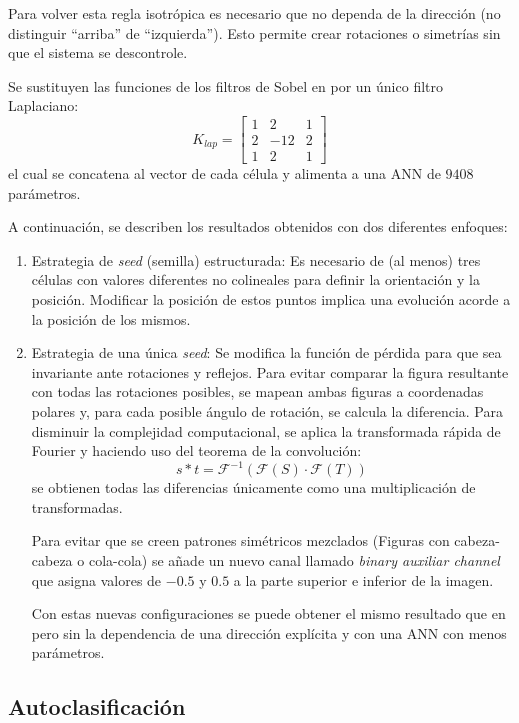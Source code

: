 Para volver esta regla isotrópica es necesario que no dependa de la dirección (no distinguir ``arriba'' de ``izquierda''). Esto permite crear rotaciones o simetrías sin que el sistema se descontrole.

Se sustituyen las funciones de los filtros de Sobel en \cite{mordvintsevNCA} por un único filtro Laplaciano:
\[
K_{lap} = \begin{bmatrix}
	1 & 2 & 1 \\
	2 & -12 & 2 \\
	1 & 2 & 1 
\end{bmatrix}
\]
el cual se concatena al vector de cada célula y alimenta a una ANN de $9408$ parámetros. 

A continuación, se describen los resultados obtenidos con dos diferentes enfoques:

\begin{enumerate}
	\item Estrategia de \textit{seed} (semilla) estructurada: Es necesario de (al menos) tres células con valores diferentes no colineales para definir la orientación y la posición. Modificar la posición de estos puntos implica una evolución acorde a la posición de los mismos.

	\item Estrategia de una única \textit{seed}: Se modifica la función de pérdida para que sea invariante ante rotaciones y reflejos. Para evitar comparar la figura resultante con todas las rotaciones posibles, se mapean ambas figuras a coordenadas polares y, para cada posible ángulo de rotación, se calcula la diferencia. Para disminuir la complejidad computacional, se aplica la transformada rápida de Fourier y haciendo uso del teorema de la convolución:
	\[
	s * t = \mathcal{F}^{-1} (\mathcal{F}(S) \cdot \mathcal{F}(T)) 
	\]
	se obtienen todas las diferencias únicamente como una multiplicación de transformadas.
	
	Para evitar que se creen patrones simétricos mezclados (Figuras con cabeza-cabeza o cola-cola) se añade un nuevo canal llamado \textit{binary auxiliar channel} que asigna valores de $-0.5$ y $0.5$ a la parte superior e inferior de la imagen.
	
	Con estas nuevas configuraciones se puede obtener el mismo resultado que en \cite{mordvintsevNCA} pero sin la dependencia de una dirección explícita y con una ANN con menos parámetros.
\end{enumerate}


\subsection{Autoclasificación}

